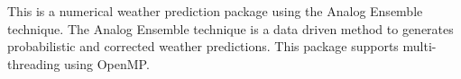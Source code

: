 This is a numerical weather prediction package using the Analog Ensemble technique. The Analog Ensemble technique is a data driven method to generates probabilistic and corrected weather predictions. This package supports multi-\/threading using Open\+MP. 